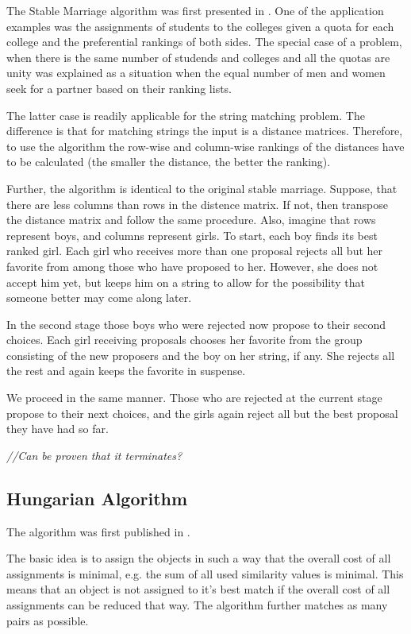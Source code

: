 \documentclass[a4paper,11pt]{article}
\begin{document}
The Stable Marriage algorithm was first presented in \cite{gale}. One of the application examples was the assignments of students to the colleges given a quota for each college and the preferential rankings of both sides. The special case of a problem, when there is the same number of studends and colleges and all the quotas are unity was explained as a situation when the equal number of men and women seek for a partner based on their ranking lists.

The latter case is readily applicable for the string matching problem. The difference is that for matching strings the input is a distance matrices. Therefore, to use the algorithm the row-wise and column-wise rankings of the distances have to be calculated (the smaller the distance, the better the ranking).

Further, the algorithm is identical to the original stable marriage. Suppose, that there are less columns than rows in the distence matrix. If not, then transpose the distance matrix and follow the same procedure. Also, imagine that rows represent boys, and columns represent girls. To start, each boy finds its best ranked girl. Each girl who receives more than one proposal rejects all but her favorite from among those who have proposed to her. However, she does not accept him yet, but keeps him on a string to allow for the possibility that someone better may come along later.

In the second stage those boys who were rejected now propose to their second choices. Each girl receiving proposals chooses her favorite from the group consisting of the new proposers and the boy on her string, if any. She rejects all the rest and again keeps the favorite in suspense.

We proceed in the same manner. Those who are rejected at the current stage propose to their next choices, and the girls again reject all but the best proposal they have had so far.

\textit{//Can be proven that it terminates?}

\subsection{Hungarian Algorithm}

The algorithm was first published in \cite{ha_firstpub}.

The basic idea is to assign the objects in such a way that the overall cost of all assignments is minimal, e.g. the sum of all used similarity values is minimal. This means that an object is not assigned to it's best match if the overall cost of all assignments can be reduced that way. The algorithm further matches as many pairs as possible.
\end{document}
